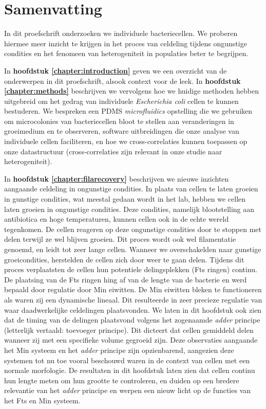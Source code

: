 \chapter*{Samenvatting}



In dit proefschrift onderzoeken we individuele bacteriecellen.
We proberen hiermee meer inzicht te krijgen in het proces van celdeling tijdens ongunstige condities en
het fenomeen van heterogeniteit in populaties beter te begrijpen.


In \textbf{hoofdstuk \ref{chapter:introduction}} geven we een overzicht van de onderwerpen in dit proefschrift,
alsook context voor de leek.
%
In \textbf{hoofdstuk \ref{chapter:methods}} beschrijven we vervolgens hoe we huidige methoden hebben uitgebreid om het gedrag van 
individuele \textit{Escherichia coli} cellen te kunnen bestuderen.
%
We bespreken een PDMS \textit{microfluidics} opstelling die we gebruiken om microcolonies van bacteriecellen bloot te stellen aan veranderingen in groeimedium en te observeren, 
software uitbreidingen die onze analyse van individuele cellen faciliteren,
en hoe we cross-correlaties kunnen toepassen op onze datastructuur (cross-correlaties zijn relevant in onze studie naar heterogeniteit).

In \textbf{hoofdstuk \ref{chapter:filarecovery}} beschrijven we nieuwe inzichten aangaande celdeling in ongunstige condities.
%
In plaats van cellen te laten groeien in gunstige condities, wat meestal gedaan wordt in het lab, hebben we cellen laten groeien in ongunstige condities.
%
Deze condities, namelijk blootstelling aan antibiotica en hoge temperaturen, kunnen cellen ook in de echte wereld tegenkomen.
%
De cellen reageren op deze ongunstige condities door te stoppen met delen terwijl ze wel blijven groeien. 
%
Dit proces wordt ook wel filamentatie genoemd, 
en leidt tot zeer lange cellen.
%
Wanneer we overschakelden naar gunstige groeicondities, 
herstelden de cellen zich door weer te gaan delen.
%
Tijdens dit proces verplaatsten de cellen hun potentiele delingsplekken (Fts ringen) continu.
%
De plaatsing van de Fts ringen hing af van de lengte van de bacterie en werd bepaald door regulatie door Min eiwitten.
%
De Min eiwitten bleken te functioneren als waren zij een dynamische lineaal.
%
Dit resulteerde
in zeer precieze regulatie van waar
daadwerkelijke celdelingen plaatsvonden.
%
We laten in dit hoofdstuk ook zien dat de timing van de delingen plaatsvond volgens het zogenaamde \textit{adder} principe (letterlijk vertaald: toevoeger principe). 
Dit dicteert dat cellen gemiddeld delen wanneer zij met een specifieke volume gegroeid zijn.
%
Deze observaties aangaande het Min systeem en het \textit{adder} principe zijn opzienbarend, 
aangezien deze systemen tot nu toe vooral beschouwd waren in de context van cellen met een normale morfologie.
%
De resultaten in dit hoofdstuk laten zien dat \ecoli cellen continu hun lengte meten om hun grootte te controleren,
en duiden op een bredere relevantie van het 
\textit{adder} principe en werpen een nieuw licht  
op de functies van het Fts en Min systeem.











